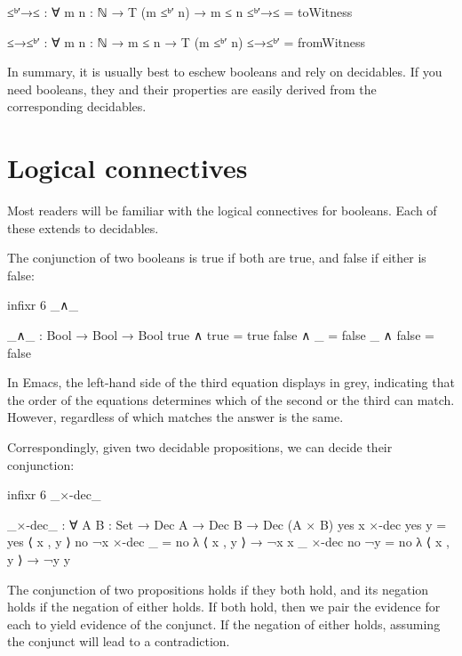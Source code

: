 \begin{fence}
\begin{code}
≤ᵇ′→≤ : ∀ {m n : ℕ} → T (m ≤ᵇ′ n) → m ≤ n
≤ᵇ′→≤  =  toWitness

≤→≤ᵇ′ : ∀ {m n : ℕ} → m ≤ n → T (m ≤ᵇ′ n)
≤→≤ᵇ′  =  fromWitness
\end{code}
\end{fence}

In summary, it is usually best to eschew booleans and rely on
decidables. If you need booleans, they and their properties are easily
derived from the corresponding decidables.

\hypertarget{logical-connectives}{%
\section{Logical connectives}\label{logical-connectives}}

Most readers will be familiar with the logical connectives for booleans.
Each of these extends to decidables.

The conjunction of two booleans is true if both are true, and false if
either is false:

\begin{fence}
\begin{code}
infixr 6 _∧_

_∧_ : Bool → Bool → Bool
true  ∧ true  = true
false ∧ _     = false
_     ∧ false = false
\end{code}
\end{fence}

In Emacs, the left-hand side of the third equation displays in grey,
indicating that the order of the equations determines which of the
second or the third can match. However, regardless of which matches the
answer is the same.

Correspondingly, given two decidable propositions, we can decide their
conjunction:

\begin{fence}
\begin{code}
infixr 6 _×-dec_

_×-dec_ : ∀ {A B : Set} → Dec A → Dec B → Dec (A × B)
yes x ×-dec yes y = yes ⟨ x , y ⟩
no ¬x ×-dec _     = no λ{ ⟨ x , y ⟩ → ¬x x }
_     ×-dec no ¬y = no λ{ ⟨ x , y ⟩ → ¬y y }
\end{code}
\end{fence}

The conjunction of two propositions holds if they both hold, and its
negation holds if the negation of either holds. If both hold, then we
pair the evidence for each to yield evidence of the conjunct. If the
negation of either holds, assuming the conjunct will lead to a
contradiction.

